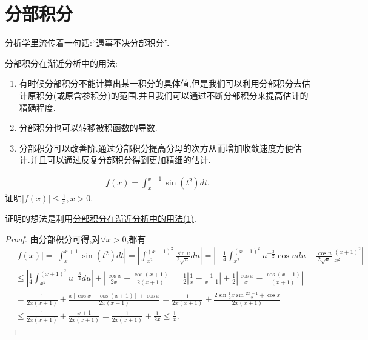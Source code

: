 \documentclass[../../main.tex]{subfiles}
\begin{document}
\section{分部积分}

分析学里流传着一句话:“遇事不决分部积分”.

分部积分在渐近分析中的用法:
\begin{enumerate}[(1)]
\item\label{分部积分在渐近分析中的用法(1)} 有时候分部积分不能计算出某一积分的具体值,但是我们可以利用分部积分去估计原积分(或原含参积分)的范围.并且我们可以通过不断分部积分来提高估计的精确程度.

\item\label{分部积分在渐近分析中的用法(2)} 分部积分也可以转移被积函数的导数.

\item\label{分部积分在渐近分析中的用法(3)} 分部积分可以改善阶.通过分部积分提高分母的次方从而增加收敛速度方便估计.并且可以通过反复分部积分得到更加精细的估计.
\end{enumerate}

\begin{example}
\begin{align*}
f\left( x \right) =\int_x^{x+1}{\sin \left( t^2 \right) dt}.
\end{align*}
证明$\left| f\left( x \right) \right|\le \frac{1}{x},x>0$.
\end{example}
\begin{note}
证明的想法是利用\hyperref[分部积分在渐近分析中的用法(1)]{分部积分在渐近分析中的用法(1)}.
\end{note}
\begin{proof}
由分部积分可得,对$\forall x>0$,都有
\begin{align*}
&\left| f\left( x \right) \right|=\left| \int_x^{x+1}{\sin \left( t^2 \right) dt} \right|=\left| \int_{x^2}^{\left( x+1 \right) ^2}{\frac{\sin u}{2\sqrt{u}}du} \right|=\left| -\frac{1}{4}\int_{x^2}^{\left( x+1 \right) ^2}{u^{-\frac{3}{2}}\cos udu}-\frac{\cos u}{2\sqrt{u}}\Big|_{x^2}^{\left( x+1 \right) ^2} \right|
\\
&\leqslant \left| \frac{1}{4}\int_{x^2}^{\left( x+1 \right) ^2}{u^{-\frac{3}{2}}du} \right|+\left| \frac{\cos x}{2x}-\frac{\cos \left( x+1 \right)}{2\left( x+1 \right)} \right|=\frac{1}{2}\left| \frac{1}{x}-\frac{1}{x+1} \right|+\frac{1}{2}\left| \frac{\cos x}{x}-\frac{\cos \left( x+1 \right)}{\left( x+1 \right)} \right|
\\
&=\frac{1}{2x\left( x+1 \right)}+\frac{x\left[ \cos x-\cos \left( x+1 \right) \right] +\cos x}{2x\left( x+1 \right)}=\frac{1}{2x\left( x+1 \right)}+\frac{2\sin \frac{1}{2}x\sin \frac{2x+1}{2}+\cos x}{2x\left( x+1 \right)}
\\
&\le \frac{1}{2x\left( x+1 \right)}+\frac{x+1}{2x\left( x+1 \right)}=\frac{1}{2x\left( x+1 \right)}+\frac{1}{2x}\leqslant \frac{1}{x}.
\end{align*}
\end{proof}
\end{document}
